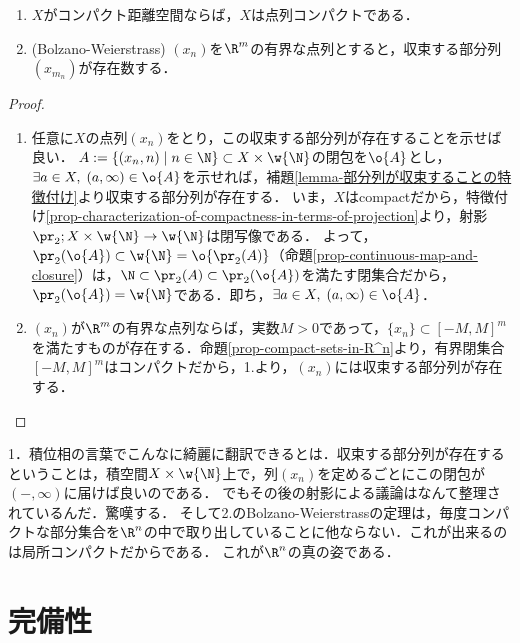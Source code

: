 \documentclass[uplatex,dvipdfmx]{jsreport}
\begin{document}
\begin{proposition}[コンパクト距離空間は点列コンパクトである]\mbox{}\label{prop-Bolzano-Weierstrass}
    \begin{enumerate}
        \item $X$がコンパクト距離空間ならば，$X$は点列コンパクトである．
        \item (Bolzano-Weierstrass) $(x_n)$を$\R^m$の有界な点列とすると，収束する部分列$(x_{m_n})$が存在数する．
    \end{enumerate}
\end{proposition}
\begin{proof}\mbox{}
    \begin{enumerate}
        \item 任意に$X$の点列$(x_n)$をとり，この収束する部分列が存在することを示せば良い．
        $A:=\{(x_n,n)\mid n\in\N\}\subset X\times\w{\N}$の閉包を$\o{A}$とし，$\exists a\in X,\;(a,\infty)\in\o{A}$を示せれば，補題\ref{lemma-部分列が収束することの特徴付け}より収束する部分列が存在する．
        いま，$X$はcompactだから，特徴付け\ref{prop-characterization-of-compactness-in-terms-of-projection}より，射影$\pr_2;X\times\w{\N}\to\w{\N}$は閉写像である．
        よって，$\pr_2(\o{A})\subset\w{\N}=\o{\pr_2(A)}$（命題\ref{prop-continuous-map-and-closure}）は，$\N\subset\pr_2(A)\subset\pr_2(\o{A})$を満たす閉集合だから，$\pr_2(\o{A})=\w{\N}$である．即ち，$\exists a\in X,\;(a,\infty)\in\o{A}$．
        \item 
        $(x_n)$が$\R^m$の有界な点列ならば，実数$M>0$であって，$\{x_n\}\subset[-M,M]^m$を満たすものが存在する．命題\ref{prop-compact-sets-in-R^n}より，有界閉集合$[-M,M]^m$はコンパクトだから，1.より，$(x_n)$には収束する部分列が存在する．
    \end{enumerate}
\end{proof}
\begin{remarks}
    1．積位相の言葉でこんなに綺麗に翻訳できるとは．収束する部分列が存在するということは，積空間$X\times\w{\N}$上で，列$(x_n)$を定めるごとにこの閉包が$(-,\infty)$に届けば良いのである．
    でもその後の射影による議論はなんて整理されているんだ．驚嘆する．
    そして2.のBolzano-Weierstrassの定理は，毎度コンパクトな部分集合を$\R^n$の中で取り出していることに他ならない．これが出来るのは局所コンパクトだからである．
    これが$\R^n$の真の姿である．
\end{remarks}

\section{完備性}
\end{document}
